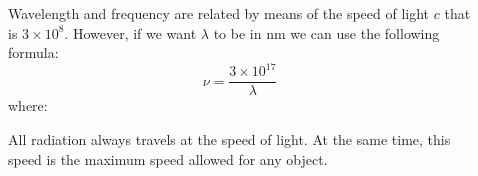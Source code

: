 \documentclass[main.tex]{subfiles}
\begin{document}
\begin{description}
\item[] 
Wavelength and frequency are related by means of the speed of light $c$ that is $3\times 10^8$. However, if we want $\lambda$ to be in nm we can use the following formula:
\begin{equation*}
\boxed{  \nu=\frac{3\times 10^{17}}{\lambda}  } 
\end{equation*}
where:
All radiation always travels at the speed of light. At the same time, this speed is the maximum speed allowed for any object.



%   
%   
%   
%   
   

\end{description}
\end{document}
